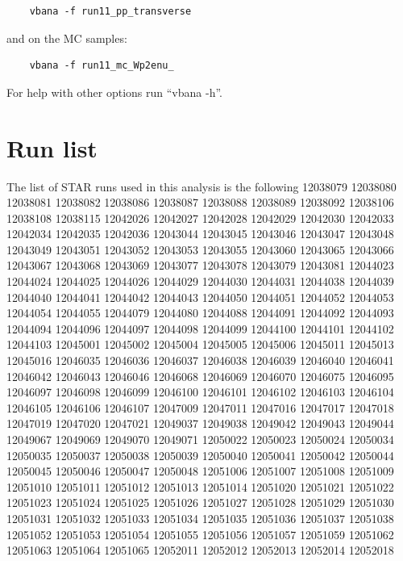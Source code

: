 \documentclass[12pt]{article}
\begin{document}
\begin{lstlisting}
    vbana -f run11_pp_transverse
\end{lstlisting}

and on the MC samples:

\begin{lstlisting}
    vbana -f run11_mc_Wp2enu_
\end{lstlisting}

For help with other options run ``vbana -h''.



\section{Run list}
The list of STAR runs used in this analysis is the following
\newline
\newline
{}
12038079
12038080
12038081
12038082
12038086
12038087
12038088
12038089
12038092
12038106
12038108
12038115
12042026
12042027
12042028
12042029
12042030
12042033
12042034
12042035
12042036
12043044
12043045
12043046
12043047
12043048
12043049
12043051
12043052
12043053
12043055
12043060
12043065
12043066
12043067
12043068
12043069
12043077
12043078
12043079
12043081
12044023
12044024
12044025
12044026
12044029
12044030
12044031
12044038
12044039
12044040
12044041
12044042
12044043
12044050
12044051
12044052
12044053
12044054
12044055
12044079
12044080
12044088
12044091
12044092
12044093
12044094
12044096
12044097
12044098
12044099
12044100
12044101
12044102
12044103
12045001
12045002
12045004
12045005
12045006
12045011
12045013
12045016
12046035
12046036
12046037
12046038
12046039
12046040
12046041
12046042
12046043
12046046
12046068
12046069
12046070
12046075
12046095
12046097
12046098
12046099
12046100
12046101
12046102
12046103
12046104
12046105
12046106
12046107
12047009
12047011
12047016
12047017
12047018
12047019
12047020
12047021
12049037
12049038
12049042
12049043
12049044
12049067
12049069
12049070
12049071
12050022
12050023
12050024
12050034
12050035
12050037
12050038
12050039
12050040
12050041
12050042
12050044
12050045
12050046
12050047
12050048
12051006
12051007
12051008
12051009
12051010
12051011
12051012
12051013
12051014
12051020
12051021
12051022
12051023
12051024
12051025
12051026
12051027
12051028
12051029
12051030
12051031
12051032
12051033
12051034
12051035
12051036
12051037
12051038
12051052
12051053
12051054
12051055
12051056
12051057
12051059
12051062
12051063
12051064
12051065
12052011
12052012
12052013
12052014
12052018
\end{document}
